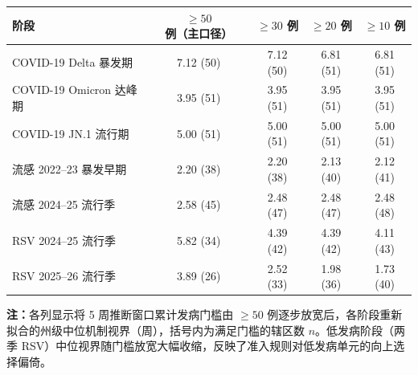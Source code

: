 \begin{tabular}{lcccc}
\toprule
阶段 & $\ge 50$ 例（主口径） & $\ge 30$ 例 & $\ge 20$ 例 & $\ge 10$ 例 \\
\midrule
COVID-19 Delta 暴发期 & 7.12 (50) & 7.12 (50) & 6.81 (51) & 6.81 (51) \\
COVID-19 Omicron 达峰期 & 3.95 (51) & 3.95 (51) & 3.95 (51) & 3.95 (51) \\
COVID-19 JN.1 流行期 & 5.00 (51) & 5.00 (51) & 5.00 (51) & 5.00 (51) \\
流感 2022--23 暴发早期 & 2.20 (38) & 2.20 (38) & 2.13 (40) & 2.12 (41) \\
流感 2024--25 流行季 & 2.58 (45) & 2.48 (47) & 2.48 (47) & 2.48 (48) \\
RSV 2024--25 流行季 & 5.82 (34) & 4.39 (42) & 4.39 (42) & 4.11 (43) \\
RSV 2025--26 流行季 & 3.89 (26) & 2.52 (33) & 1.98 (36) & 1.73 (40) \\
\bottomrule
\end{tabular}
\begin{flushleft}\scriptsize \textbf{注：}各列显示将 5 周推断窗口累计发病门槛由 $\ge 50$ 例逐步放宽后，各阶段重新拟合的州级中位机制视界（周），括号内为满足门槛的辖区数 $n$。低发病阶段（两季 RSV）中位视界随门槛放宽大幅收缩，反映了准入规则对低发病单元的向上选择偏倚。\end{flushleft}
